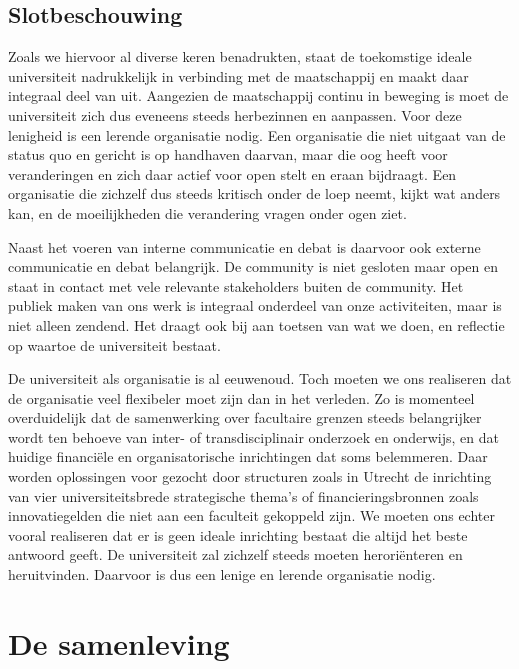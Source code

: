 \documentclass{jote-book}
\begin{document}
	\section{Slotbeschouwing}



	Zoals we hiervoor al diverse keren benadrukten, staat de toekomstige ideale universiteit nadrukkelijk in verbinding met de maatschappij en maakt daar integraal deel van uit. Aangezien de maatschappij continu in beweging is moet de universiteit zich dus eveneens steeds herbezinnen en aanpassen. Voor deze lenigheid is een lerende organisatie nodig. Een organisatie die niet uitgaat van de status quo en gericht is op handhaven daarvan, maar die oog heeft voor veranderingen en zich daar actief voor open stelt en eraan bijdraagt. Een organisatie die zichzelf dus steeds kritisch onder de loep neemt, kijkt wat anders kan, en de moeilijkheden die verandering vragen onder ogen ziet.



	Naast het voeren van interne communicatie en debat is daarvoor ook externe communicatie en debat belangrijk. De community is niet gesloten maar open en staat in contact met vele relevante stakeholders buiten de community. Het publiek maken van ons werk is integraal onderdeel van onze activiteiten, maar is niet alleen zendend. Het draagt ook bij aan toetsen van wat we doen, en reflectie op waartoe de universiteit bestaat.



	De universiteit als organisatie is al eeuwenoud. Toch moeten we ons realiseren dat de organisatie veel flexibeler moet zijn dan in het verleden. Zo is momenteel overduidelijk dat de samenwerking over facultaire grenzen steeds belangrijker wordt ten behoeve van inter- of transdisciplinair onderzoek en onderwijs, en dat huidige financiële en organisatorische inrichtingen dat soms belemmeren. Daar worden oplossingen voor gezocht door structuren zoals in Utrecht de inrichting van vier universiteitsbrede strategische thema's of financieringsbronnen zoals innovatiegelden die niet aan een faculteit gekoppeld zijn. We moeten ons echter vooral realiseren dat er is geen ideale inrichting bestaat die altijd het beste antwoord geeft. De universiteit zal zichzelf steeds moeten heroriënteren en heruitvinden. Daarvoor is dus een lenige en lerende organisatie nodig.







	\chapter{De samenleving }
\end{document}

